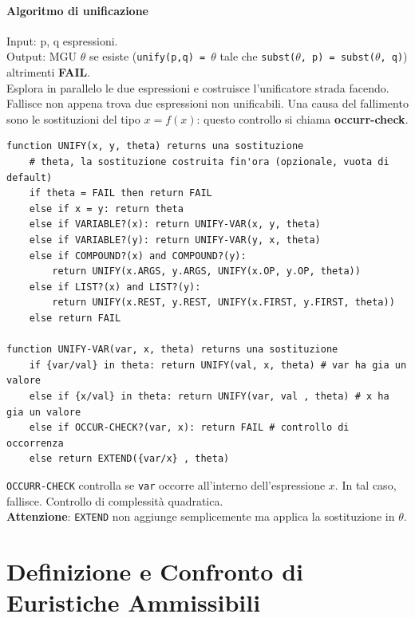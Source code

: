 \documentclass[10pt]{book}
\begin{document}
\paragraph{Algoritmo di unificazione} Input: p, q espressioni.\\
Output: MGU $\theta$ se esiste (\texttt{unify(p,q) = $\theta$} tale che \texttt{subst($\theta$, p) = subst($\theta$, q)}) altrimenti \textbf{FAIL}.\\
Esplora in parallelo le due espressioni e costruisce l'unificatore strada facendo. Fallisce non appena trova due espressioni non unificabili. Una causa del fallimento sono le sostituzioni del tipo $x = f(x)$: questo controllo si chiama \textbf{occurr-check}.
\begin{center}
	\begin{lstlisting}
function UNIFY(x, y, theta) returns una sostituzione
	# theta, la sostituzione costruita fin'ora (opzionale, vuota di default)
	if theta = FAIL then return FAIL
	else if x = y: return theta
	else if VARIABLE?(x): return UNIFY-VAR(x, y, theta)
	else if VARIABLE?(y): return UNIFY-VAR(y, x, theta)
	else if COMPOUND?(x) and COMPOUND?(y):
		return UNIFY(x.ARGS, y.ARGS, UNIFY(x.OP, y.OP, theta))
	else if LIST?(x) and LIST?(y):
		return UNIFY(x.REST, y.REST, UNIFY(x.FIRST, y.FIRST, theta))
	else return FAIL

function UNIFY-VAR(var, x, theta) returns una sostituzione
	if {var/val} in theta: return UNIFY(val, x, theta) # var ha gia un valore
	else if {x/val} in theta: return UNIFY(var, val , theta) # x ha gia un valore
	else if OCCUR-CHECK?(var, x): return FAIL # controllo di occorrenza
	else return EXTEND({var/x} , theta)
	\end{lstlisting}
\end{center}
\texttt{OCCURR-CHECK} controlla se \texttt{var} occorre all'interno dell'espressione $x$. In tal caso, fallisce. Controllo di complessità quadratica.\\
\textbf{Attenzione}: \texttt{EXTEND} non aggiunge semplicemente ma applica la sostituzione in $\theta$.
\section{Definizione e Confronto di Euristiche Ammissibili}
\end{document}
